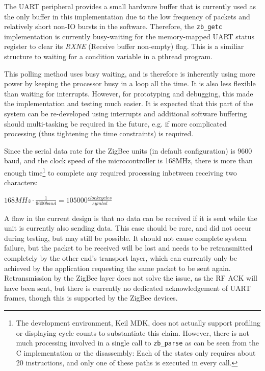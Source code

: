 The UART peripheral provides a small hardware buffer that is currently used as the only buffer in this implementation due to the low frequency of packets and relatively short non-IO bursts in the software. Therefore, the \texttt{zb\_getc} implementation is currently busy-waiting for the memory-mapped UART status register to clear its \emph{RXNE} (Receive buffer non-empty) flag. This is a similiar structure to waiting for a condition variable in a pthread program. %

This polling method uses busy waiting, and is therefore is inherently using more power by keeping the processor busy in a loop all the time. It is also less flexible than waiting for interrupts. However, for prototyping and debugging, this made the implementation and testing much easier. It is expected that this part of the system can be re-developed using interrupts and additional software buffering should multi-tasking be required in the future, e.g. if more complicated processing (thus tightening the time constraints) is required.

Since the serial data rate for the ZigBee units (in default configuration) is 9600 baud, and the clock speed of the microcontroller is 168MHz, there is more than enough time\footnote{The development environment, Keil MDK, does not actually support profiling or displaying cycle counts to substantiate this claim. However, there is not much processing involved in a single call to \texttt{zb\_parse} as can be seen from the C implementation or the disassembly: Each of the states only requires about 20 instructions, and only one of these paths is executed in every call.} to complete any required processing inbetween receiving two characters:

\begin{center}
	$168 \unit{MHz} \cdot \frac{1}{9600 \unit{baud}} = 105000 \unit{\frac{clock cycles}{symbol}}$
\end{center}

A flaw in the current design is that no data can be received if it is sent while the unit is currently also sending data. This case should be rare, and did not occur during testing, but may still be possible. It should not cause complete system failure, but the packet to be received will be lost and needs to be retransmitted completely by the other end's transport layer, which can currently only be achieved by the application requesting the same packet to be sent again. Retransmission by the ZigBee layer does not solve the issue, as the RF ACK will have been sent, but there is currently no dedicated acknowledgement of UART frames, though this is supported by the ZigBee devices. %

